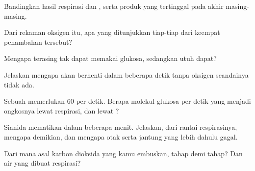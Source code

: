 \begin{exercise}[$\star$]\label{exo:g12:respiration-fermentation:5}
Bandingkan hasil  respirasi dan , serta produk yang
tertinggal pada akhir masing-masing.
\end{exercise}

\begin{exercise}[$\star\star$]\label{exo:g12:respiration-fermentation:6}
Dari rekaman oksigen itu, apa yang ditunjukkan tiap-tiap dari keempat
penambahan tersebut?
\end{exercise}

\begin{exercise}[$\star\star$]\label{exo:g12:respiration-fermentation:7}
Mengapa  terasing tak dapat memakai glukosa, sedangkan 
utuh dapat?
\end{exercise}

\begin{exercise}[$\star\star$]\label{exo:g12:respiration-fermentation:8}
Jelaskan mengapa  akan berhenti dalam beberapa detik tanpa
oksigen seandainya  tidak ada.
\end{exercise}

\begin{exercise}[$\star\star$]\label{exo:g12:respiration-fermentation:9}
Sebuah  memerlukan 60  per detik. Berapa molekul glukosa per
detik yang menjadi ongkosnya lewat respirasi, dan lewat ?
\end{exercise}

\begin{exercise}[$\star\star$]\label{exo:g12:respiration-fermentation:10}
Sianida mematikan dalam beberapa menit. Jelaskan, dari rantai
respirasinya, mengapa demikian, dan mengapa otak serta jantung yang
lebih dahulu gagal.
\end{exercise}

\begin{exercise}[$\star\star$]\label{exo:g12:respiration-fermentation:11}
Dari mana asal karbon dioksida yang kamu embuskan, tahap demi tahap?
Dan air yang dibuat respirasi?
\end{exercise}

